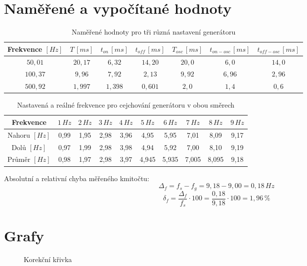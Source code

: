 \documentclass[12pt]{article} %
\begin{document}
\section{Naměřené a vypočítané hodnoty}
\begin{table}[H]
\caption{Naměřené hodnoty pro tři různá nastavení generátoru}
\begin{tabular}{|c|c|c|c|c|c|c|}
\hline 
Frekvence $[Hz]$ & $T\,[ms]$ & $t_{on}\,[ms]$ & $t_{off}\,[ms]$ & $T_{osc}\,[ms]$ & $t_{on-osc}\,[ms]$ & $t_{off-osc}\,[ms]$ \\ 
\hline 
$50,01$ & $20,17$ & $6,32$ & $14,20$ & $20,0$ & $6,0$ & $14,0$ \\ 
\hline 
$100,37$ & $9,96$ & $7,92$ & $2,13$ & $9,92$ & $6,96$ & $2,96$ \\ 
\hline 
$500,92$ & $1,997$ & $1,398$ & $0,601$ & $2,0$ & $1,4$ & $0,6$ \\ 
\hline 
\end{tabular} 
\end{table}

\begin{table}[H]
\caption{Nastavená a reálné frekvence pro cejchování generátoru v obou směrech}
\begin{tabular}{|c|c|c|c|c|c|c|c|c|c|}
\hline 
Frekvence & $1\,Hz$ & $2\,Hz$ & $3\,Hz$ & $4\,Hz$ & $5\,Hz$ & $6\,Hz$ & $7\,Hz$ & $8\,Hz$ & $9\,Hz$ \\ 
\hline 
Nahoru $[Hz]$ & 0,99 & 1,95 & 2,98 & 3,96 & 4,95 & 5,95 & 7,01 & 8,09 & 9,17 \\ 
\hline 
Dolů $[Hz]$ & 0,97 & 1,99 & 2,98 & 3,98 & 4,94 & 5,92 & 7,00 & 8,10 & 9,19 \\ 
\hline 
Průměr $[Hz]$ & 0,98 & 1,97 & 2,98 & 3,97 & 4,945 & 5,935 & 7,005 & 8,095 & 9,18 \\ 
\hline
\end{tabular} 
\end{table}

Absolutní a relativní chyba měřeného kmitočtu:
\begin{equation}
\Delta_f = f_s - f_g = 9,18 - 9,00 = 0,18\,Hz
\end{equation}
\begin{equation}
\delta_f = \frac{\Delta_f}{f_s}\cdot 100 = \frac{0,18}{9,18}\cdot 100 = 1,96\,\%
\end{equation}

\section{Grafy}
\begin{figure}[H]
\centering
	\caption{Korekční křivka}
\end{figure}
\end{document}
